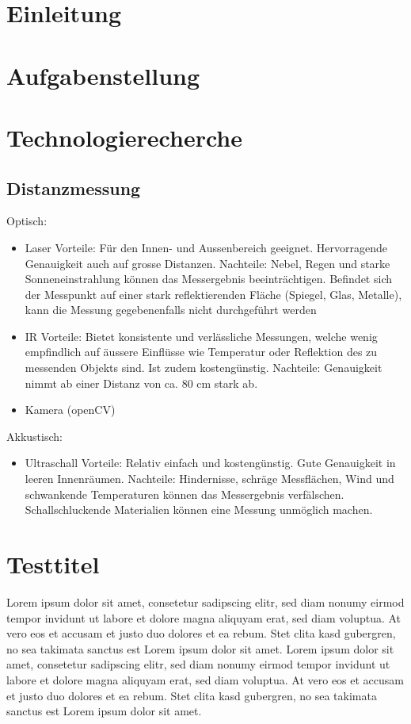 \section{Einleitung}
\section{Aufgabenstellung}
\section{Technologierecherche}
\subsection{Distanzmessung}
Optisch:
\begin{itemize}
\item Laser
Vorteile: 	
Für den Innen- und Aussenbereich geeignet. Hervorragende Genauigkeit auch auf grosse Distanzen.
Nachteile: 
Nebel, Regen und starke Sonneneinstrahlung können das Messergebnis beeinträchtigen. Befindet sich der Messpunkt auf einer stark reflektierenden Fläche (Spiegel, Glas, Metalle), kann die Messung gegebenenfalls nicht durchgeführt werden
\item IR
Vorteile:
Bietet konsistente und verlässliche Messungen, welche wenig empfindlich auf äussere Einflüsse wie Temperatur oder Reflektion des zu messenden Objekts sind. Ist zudem kostengünstig.
Nachteile:
Genauigkeit nimmt ab einer Distanz von ca. 80 cm stark ab.
\item Kamera (openCV)
\end{itemize}
Akkustisch:
\begin{itemize}
\item Ultraschall
Vorteile:
Relativ einfach und kostengünstig. Gute Genauigkeit in leeren Innenräumen.
Nachteile:
Hindernisse, schräge Messflächen, Wind und schwankende Temperaturen können das Messergebnis verfälschen. Schallschluckende Materialien können eine Messung unmöglich machen.
\end{itemize}

\section{Testtitel}

Lorem ipsum dolor sit amet, consetetur sadipscing elitr, sed diam nonumy eirmod tempor invidunt ut labore et dolore magna aliquyam erat, sed diam voluptua. At vero eos et accusam et justo duo dolores et ea rebum. Stet clita kasd gubergren, no sea takimata sanctus est Lorem ipsum dolor sit amet. Lorem ipsum dolor sit amet, consetetur sadipscing elitr, sed diam nonumy eirmod tempor invidunt ut labore et dolore magna aliquyam erat, sed diam voluptua. At vero eos et accusam et justo duo dolores et ea rebum. Stet clita kasd gubergren, no sea takimata sanctus est Lorem ipsum dolor sit amet.